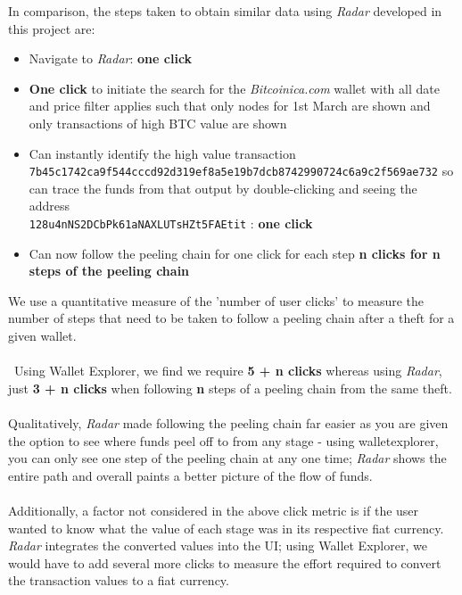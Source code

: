In comparison, the steps taken to obtain similar data using \textit{Radar} developed in this project are:
\begin{itemize}
    \item Navigate to \textit{Radar}: \textbf{one click}
    \item \textbf{One click} to initiate the search for the \textit{Bitcoinica.com} wallet with all date and price filter applies such that only nodes for 1st March are shown and only transactions of high BTC value are shown 
    \item Can instantly identify the high value transaction \\\texttt{7b45c1742ca9f544cccd92d319ef8a5e19b7dcb8742990724c6a9c2f569ae732} so can trace the funds from that output by double-clicking and seeing the address \\\texttt{128u4nNS2DCbPk61aNAXLUTsHZt5FAEtit} : \textbf{one click}
    \item Can now follow the peeling chain for one click for each step \textbf{n clicks for n steps of the peeling chain}
\end{itemize}
We use a quantitative measure of the 'number of user clicks' to measure the number of steps that need to be taken to follow a peeling chain after a theft for a given wallet. 
\\\\\
Using Wallet Explorer, we find we require \textbf{5 + n clicks} whereas using \textit{Radar}, just \textbf{3 + n clicks} when following \textbf{n} steps of a peeling chain from the same theft.
\\\\
Qualitatively, \textit{Radar} made following the peeling chain far easier as you are given the option to see where funds peel off to from any stage - using walletexplorer, you can only see one step of the peeling chain at any one time; \textit{Radar} shows the entire path and overall paints a better picture of the flow of funds. 
\\\\
Additionally, a factor not considered in the above click metric is if the user wanted to know what the value of each stage was in its respective fiat currency. \textit{Radar} integrates the converted values into the UI; using Wallet Explorer, we would have to add several more clicks to measure the effort required to convert the transaction values to a fiat currency.

